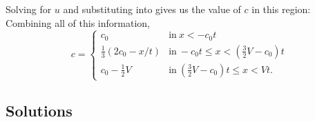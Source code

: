\documentclass[12pt]{book}
\begin{document}
{Solving  for $u$ and substituting into  gives us the value of $c$ in this region:
Combining all of this information,
 \begin{displaymath}
   c = \left\{
     \begin{array}{ll}
       c_0 & \mathrm{in}\  x<-c_0 t \\
       \frac{1}{3}\left(2c_0 - x/t\right) & \mathrm{in}\  -c_0t \le x < \left(\frac{3}{2}V-c_0\right)t \\
       c_0 - \frac{1}{2}V & \mathrm{in}\  \left(\frac{3}{2}V-c_0\right)t \le x <Vt.
     \end{array}
   \right.
\end{displaymath} 

}




\stopAssignment

\begin{appendices}
\chapter{Solutions}
\setcounter{secnumdepth}{0}



\end{appendices}

\clearpage




\end{document}
